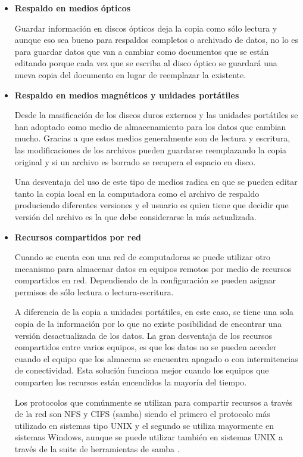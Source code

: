     \begin{itemize}
    
      \item \textbf{Respaldo en medios \'{opticos}}

Guardar informaci\'{o}n en discos \'{o}pticos deja la copia como s\'{o}lo lectura y aunque eso sea bueno para respaldos completos o archivado de datos, no lo es para guardar datos que van a cambiar como documentos que se est\'{a}n editando porque cada vez que se escriba al disco \'{o}ptico se guardar\'{a} una nueva copia del documento en lugar de reemplazar la existente.

      \item \textbf{Respaldo en medios magn\'{e}ticos y unidades port\'{a}tiles}

Desde la masificaci\'{o}n de los discos duros externos y las unidades port\'{a}tiles se han adoptado como medio de almacenamiento para los datos que cambian mucho. Gracias a que estos medios generalmente son de lectura y escritura, las modificaciones de los archivos pueden guardarse reemplazando la copia original y si un archivo es borrado se recupera el espacio en disco.

Una desventaja del uso de este tipo de medios radica en que se pueden editar tanto la copia local en la computadora como el archivo de respaldo produciendo diferentes versiones y el usuario es quien tiene que decidir que versi\'{o}n del archivo es la que debe considerarse la m\'{a}s actualizada.

      \item \textbf{Recursos compartidos por red}

Cuando se cuenta con una red de computadoras se puede utilizar otro mecanismo para almacenar datos en equipos remotos por medio de recursos compartidos en red. Dependiendo de la configuraci\'{o}n se pueden asignar permisos de s\'{o}lo lectura o lectura-escritura.

A diferencia de la copia a unidades port\'{a}tiles, en este caso, se tiene una sola copia de la informaci\'{o}n por lo que no existe posibilidad de encontrar una versi\'{o}n desactualizada de los datos. La gran desventaja de los recursos compartidos entre varios equipos, es que los datos no se pueden acceder cuando el equipo que los almacena se encuentra apagado o con intermitencias de conectividad. Esta soluci\'{o}n funciona mejor cuando los equipos que comparten los recursos est\'{a}n encendidos la mayor\'{i}a del tiempo.

Los protocolos que com\'{u}nmente se utilizan para compartir recursos a trav\'{e}s de la red son NFS y CIFS (samba) siendo el primero el protocolo m\'{a}s utilizado en sistemas tipo UNIX y el segundo se utiliza mayormente en sistemas Windows, aunque se puede utilizar tambi\'{e}n en sistemas UNIX a trav\'{e}s de la suite de herramientas de samba \cite{_samba_????}.


\end{itemize}

